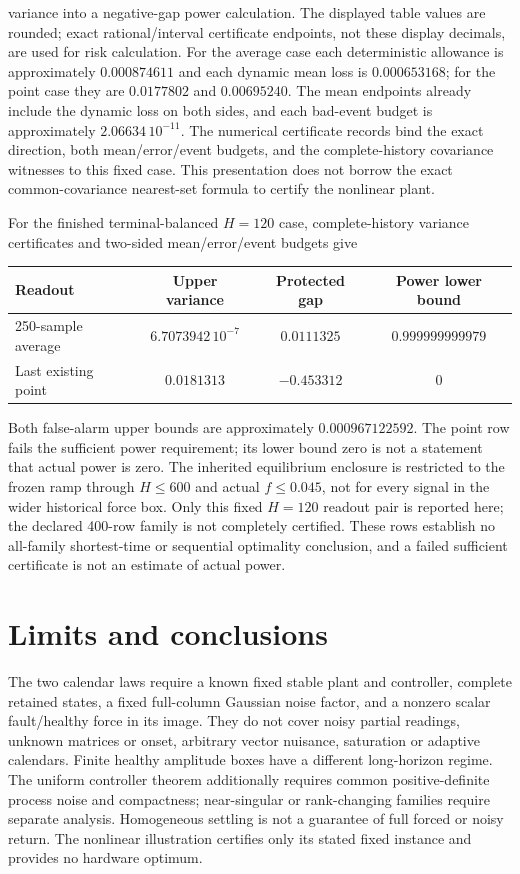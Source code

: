 variance into a negative-gap power calculation.
The displayed table values are rounded; exact rational/interval certificate
endpoints, not these display decimals, are used for risk calculation.
For the average case each deterministic allowance is approximately
$0.000874611$ and each dynamic mean loss is $0.000653168$;
for the point case they are $0.0177802$ and $0.00695240$.
The mean endpoints already include the dynamic loss on both sides, and each
bad-event budget is approximately $2.06634\,10^{-11}$.
The numerical certificate records bind the exact direction, both mean/error/event
budgets, and the complete-history covariance witnesses to this fixed case. This presentation does not borrow the
exact common-covariance nearest-set formula to certify the nonlinear plant.

For the finished terminal-balanced $H=120$ case, complete-history variance
certificates and two-sided mean/error/event budgets give
\begin{center}
\begin{tabular}{lccc}
\toprule
Readout & Upper variance & Protected gap & Power lower bound\\
\midrule
250-sample average & $6.7073942\,10^{-7}$ & $0.0111325$ & $0.999999999979$\\
Last existing point & $0.0181313$ & $-0.453312$ & $0$\\
\bottomrule
\end{tabular}
\end{center}
Both false-alarm upper bounds are approximately $0.000967122592$.
The point row fails the sufficient power requirement; its lower bound zero is
not a statement that actual power is zero. The inherited equilibrium enclosure
is restricted to the frozen ramp through $H\le600$
and actual $f\le0.045$, not for every signal in the wider historical force box.
Only this fixed $H=120$ readout pair is reported here; the declared 400-row
family is not completely certified. These rows establish no all-family
shortest-time or sequential optimality conclusion, and a failed sufficient
certificate is not an estimate of actual power.

\section{Limits and conclusions}\label{sf:conclusion}
The two calendar laws require a known fixed stable plant and controller,
complete retained states, a fixed full-column Gaussian noise factor, and a
nonzero scalar fault/healthy force in its image. They do not cover noisy
partial readings, unknown matrices or onset, arbitrary vector nuisance,
saturation or adaptive calendars. Finite healthy amplitude boxes have a
different long-horizon regime. The uniform controller theorem additionally
requires common positive-definite process noise and compactness; near-singular
or rank-changing families require separate analysis. Homogeneous settling is
not a guarantee of full forced or noisy return. The nonlinear illustration
certifies only its stated fixed instance and provides no hardware optimum.

